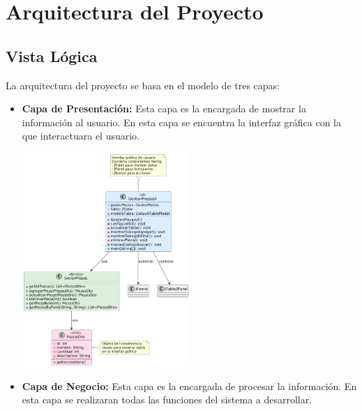\section*{Arquitectura del Proyecto}

\subsection*{Vista Lógica}
La arquitectura del proyecto se basa en el modelo de tres capas: 
\begin{itemize}
    \item \textbf{Capa de Presentación:} Esta capa es la encargada de mostrar la información al usuario. 
    En esta capa se encuentra la interfaz gráfica con la que interactuara el usuario.
    \newline
    
    \begin{center}   
        \includegraphics[width=0.5\textwidth]{imag/DiagramaFinalPL.png}
    \end{center}
     \item \textbf{Capa de Negocio:} Esta capa es la encargada de procesar la información. 
    En esta capa se realizaran todas las funciones del sistema a desarrollar.
    \newline
    

\end{itemize}
